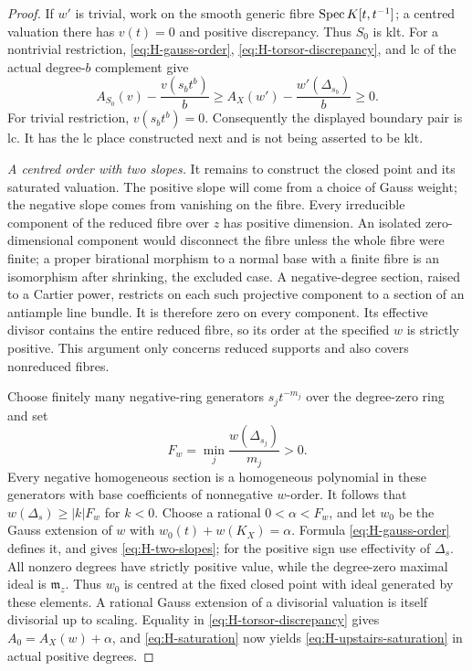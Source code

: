 \begin{proof}
If $w'$ is trivial, work on the smooth generic fibre
$\operatorname{Spec} K[t,t^{-1}]$; a centred valuation there has $v(t)=0$ and positive
discrepancy.  Thus $S_0$ is klt.  For a nontrivial restriction,
\eqref{eq:H-gauss-order}, \eqref{eq:H-torsor-discrepancy}, and lc of the
actual degree-$b$ complement give
\[
 A_{S_0}(v)-\frac{v(s_bt^b)}b
 \ge A_X(w')-\frac{w'(\Delta_{s_b})}b\ge0.
\]
For trivial restriction, $v(s_bt^b)=0$.  Consequently the displayed
boundary pair is lc.  It has the lc place constructed next and is not
being asserted to be klt.

\medskip
\noindent\textit{A centred order with two slopes.}
It remains to construct the closed point and its saturated valuation.
The positive slope will come from a choice of Gauss weight; the negative
slope comes from vanishing on the fibre.
Every irreducible component of the reduced fibre over $z$ has positive
dimension.  An isolated zero-dimensional component would disconnect
the fibre unless the whole fibre were finite; a proper birational
morphism to a normal base with a finite fibre is an isomorphism after
shrinking, the excluded case.  A negative-degree section, raised to a
Cartier power, restricts on each such projective component to a section
of an antiample line bundle.  It is therefore zero on every component.
Its effective divisor contains the entire reduced fibre, so its order
at the specified $w$ is strictly positive.  This argument only concerns
reduced supports and also covers nonreduced fibres.

Choose finitely many negative-ring generators $s_jt^{-m_j}$ over the
degree-zero ring and set
\[
 F_w=\min_j\frac{w(\Delta_{s_j})}{m_j}>0.
\]
Every negative homogeneous section is a homogeneous polynomial in these
generators with base coefficients of nonnegative $w$-order.  It follows
that $w(\Delta_s)\ge |k|F_w$ for $k<0$.
Choose a rational $0<\alpha<F_w$, and let $w_0$ be the Gauss extension
of $w$ with $w_0(t)+w(K_X)=\alpha$.  Formula
\eqref{eq:H-gauss-order} defines it, and gives
\eqref{eq:H-two-slopes}; for the positive sign use effectivity of
$\Delta_s$.  All nonzero degrees have strictly positive value, while
the degree-zero maximal ideal is $\mathfrak m_z$.  Thus $w_0$ is centred
at the fixed closed point with ideal generated by these elements.  A
rational Gauss extension of a divisorial valuation is itself divisorial
up to scaling.  Equality in \eqref{eq:H-torsor-discrepancy} gives
$A_0=A_X(w)+\alpha$, and \eqref{eq:H-saturation} now yields
\eqref{eq:H-upstairs-saturation} in actual positive degrees.
\end{proof}

